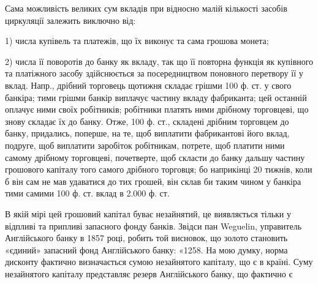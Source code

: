 Сама можливість великих сум вкладів при відносно малій кількості засобів
циркуляції залежить виключно від:

1) числа купівель та платежів, що їх виконує та сама грошова монета;

2) числа її поворотів до банку як вкладу, так що її повторна функція як
купівного та платіжного засобу здійснюється за посередництвом поновного перетвору
її у вклад. Напр., дрібний торговець щотижня складає грішми 100 ф. ст.
у свого банкіра; тими грішми банкір виплачує частину вкладу фабриканта;
цей останній оплачує ними своїх робітників; робітники платять ними дрібному
торговцеві, що знову складає їх до банку. Отже, 100 ф. ст., складені дрібним
торговцем до банку, придались, поперше, на те, щоб виплатити фабрикантові
його вклад, подруге, щоб виплатити заробіток робітникам, потрете, щоб платити
ними самому дрібному торговцеві, почетверте, щоб скласти до банку дальшу
частину грошового капіталу того самого дрібного торговця; бо наприкінці
20 тижнів, коли б він сам не мав удаватися до тих грошей, він склав би таким
чином у банкіра тими самими 100 ф. ст. вклад в 2.000 ф. ст.

В якій мірі цей грошовий капітал буває незайнятий, це виявляється тільки
у відпливі та припливі запасного фонду банків. Звідси пан Weguelin, управитель
Англійського банку в 1857 році, робить той висновок, що золото становить
«єдиний» запасний фонд Англійського банку: «1258. На мою думку, норма
дисконту фактично визначається сумою незайнятого капіталу, що є в країні. Суму
незайнятого капіталу представляє резерв Англійського банку, що фактично є
\parbreak{}  %
